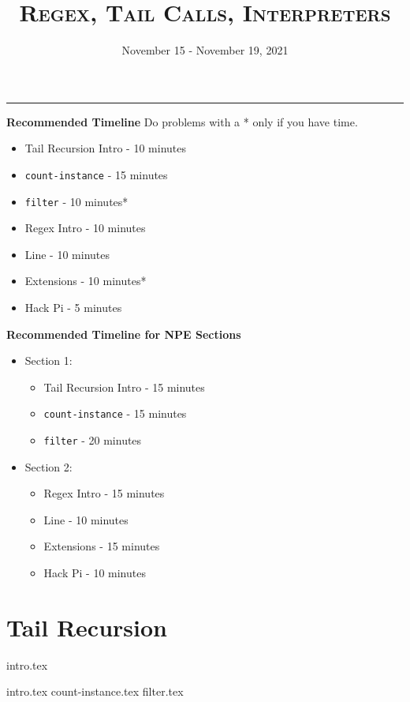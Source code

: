 \documentclass{exam}
\title{\textsc{Regex, Tail Calls, Interpreters}}
\date{November 15 - November 19, 2021}
\begin{document}
\maketitle
\rule{\textwidth}{0.15em}
\fontsize{12}{15}\selectfont

\begin{guide}
\begin{blocksection}
    \textbf{Recommended Timeline}
	Do problems with a * only if you have time.
    \begin{itemize}
        \item Tail Recursion Intro - 10 minutes
        \item \lstinline{count-instance} - 15 minutes
        \item \lstinline{filter} - 10 minutes*
        \item Regex Intro - 10 minutes
        \item Line - 10 minutes
        \item Extensions - 10 minutes*
        \item Hack Pi - 5 minutes
    \end{itemize}
    \vspace{.5cm}
    \textbf{Recommended Timeline for NPE Sections}
    \begin{itemize}
        \item Section 1:
            \begin{itemize}
                \item Tail Recursion Intro - 15 minutes
                \item \lstinline{count-instance} - 15 minutes
                \item \lstinline{filter} - 20 minutes
            \end{itemize}
        \item Section 2:
            \begin{itemize}
				\item Regex Intro - 15 minutes
				\item Line - 10 minutes
				\item Extensions - 15 minutes
                \item Hack Pi - 10 minutes
            \end{itemize}
    \end{itemize}
\end{blocksection}
\newpage
\end{guide}

\section{Tail Recursion}
{intro.tex}
\begin{questions}
{intro.tex}
{count-instance.tex}
{filter.tex}
\end{questions}
\end{document}
